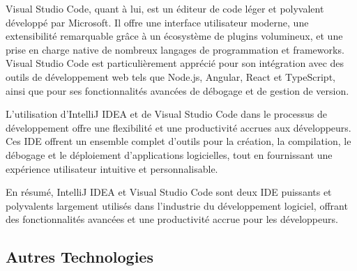 \documentclass[a4paper, 11pt, openany]{report}
\begin{document}
Visual Studio Code, quant à lui, est un éditeur de code léger et polyvalent développé par Microsoft. Il offre une interface utilisateur moderne, une extensibilité remarquable grâce à un écosystème de plugins volumineux, et une prise en charge native de nombreux langages de programmation et frameworks. Visual Studio Code est particulièrement apprécié pour son intégration avec des outils de développement web tels que Node.js, Angular, React et TypeScript, ainsi que pour ses fonctionnalités avancées de débogage et de gestion de version.

L'utilisation d'IntelliJ IDEA et de Visual Studio Code dans le processus de développement offre une flexibilité et une productivité accrues aux développeurs. Ces IDE offrent un ensemble complet d'outils pour la création, la compilation, le débogage et le déploiement d'applications logicielles, tout en fournissant une expérience utilisateur intuitive et personnalisable.

En résumé, IntelliJ IDEA et Visual Studio Code sont deux IDE puissants et polyvalents largement utilisés dans l'industrie du développement logiciel, offrant des fonctionnalités avancées et une productivité accrue pour les développeurs.


\subsection{Autres Technologies}
\end{document}
